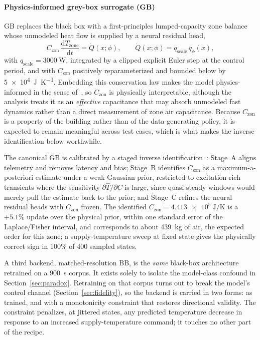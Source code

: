 \documentclass[5p]{elsarticle}
\newcommand{\Czon}{\ensuremath{C_{\mathrm{zon}}}}
\begin{document}
\paragraph{Physics-informed grey-box surrogate (GB)}
GB replaces the black box with a first-principles lumped-capacity zone balance whose unmodeled heat
flow is supplied by a neural residual head,
\begin{equation}
\Czon\,\frac{\mathrm{d}T_{\mathrm{zone}}}{\mathrm{d}t}=\dot{Q}(x;\phi),
\qquad \dot{Q}(x;\phi)=q_{\mathrm{scale}}\,q_\phi(x),
\label{eq:rc}
\end{equation}
with $q_{\mathrm{scale}}=\SI{3000}{\watt}$, integrated by a clipped explicit Euler step at the
control period, and with \Czon{} positively reparameterized and bounded below by
\SI{5e4}{\joule\per\kelvin}. Embedding this conservation law makes the model physics-informed in the
sense of~\cite{Raissi2019PINN,Karpatne2017TheoryGuided,Willard2022PIML,Hedayat2025PINN}, so \Czon{}
is physically interpretable, although the analysis treats it as an \emph{effective} capacitance that
may absorb unmodeled fast dynamics rather than a direct measurement of zone air capacitance. Because
\Czon{} is a property of the building rather than of the data-generating policy, it is expected to
remain meaningful across test cases, which is what makes the inverse identification below
worthwhile.

The canonical GB is calibrated by a staged inverse
identification~\cite{Bacher2011RCIdentification}: Stage~A aligns telemetry and removes latency and
bias; Stage~B identifies \Czon{} as a maximum-a-posteriori estimate under a weak Gaussian prior,
restricted to excitation-rich transients where the sensitivity $\partial\widehat{T}/\partial C$ is
large, since quasi-steady windows would merely pull the estimate back to the prior; and Stage~C
refines the neural residual heads with \Czon{} frozen. The identified
$\Czon=\SI{4.413e5}{\joule\per\kelvin}$ is a $+5.1\%$ update over the physical prior, within one
standard error of the Laplace/Fisher interval, and corresponds to about \SI{439}{\kilogram} of air,
the expected order for this zone; a supply-temperature sweep at fixed state gives the physically
correct sign in 100\% of 400 sampled states.

A third backend, matched-resolution BB, is the \emph{same} black-box architecture retrained on a
\SI{900}{\second} corpus. It exists solely to isolate the model-class confound in
Section~\ref{sec:paradox}. Retraining on that corpus turns out to break the model's control channel
(Section~\ref{sec:fidelity}), so the backend is carried in two forms: as trained, and with a
monotonicity constraint that restores directional validity. The constraint penalizes, at jittered
states, any predicted temperature decrease in response to an increased supply-temperature command;
it touches no other part of the recipe.
\end{document}
